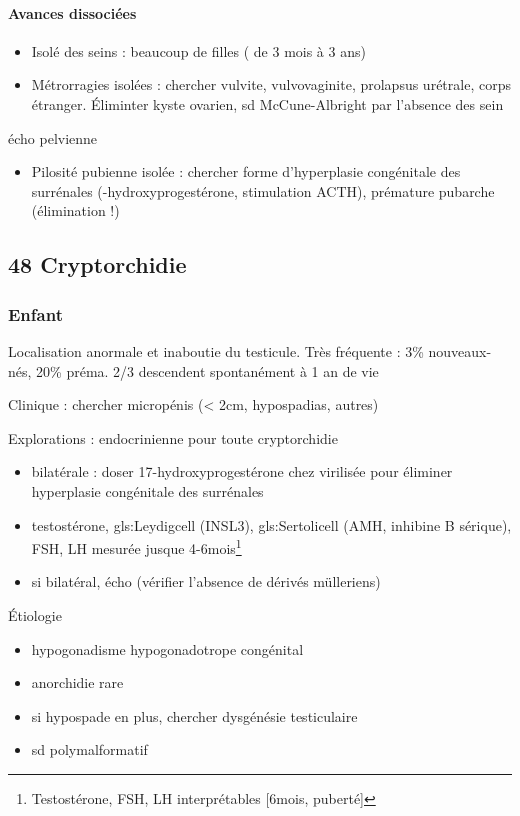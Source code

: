 \documentclass[11pt]{article}
\begin{document}
\paragraph{Avances dissociées}
\label{sec:org7b3ba32}
\begin{itemize}
\item Isolé des seins : beaucoup de filles ( de 3 mois à 3 ans)
\item Métrorragies isolées : chercher vulvite, vulvovaginite, prolapsus urétrale,
corps étranger. Éliminter kyste ovarien, sd McCune-Albright par l'absence des
sein
\end{itemize}
\thus écho pelvienne
\begin{itemize}
\item Pilosité pubienne isolée : chercher forme d'hyperplasie congénitale des
surrénales (-hydroxyprogestérone, stimulation ACTH), prémature pubarche
(élimination !)
\end{itemize}

\subsection{48 \textdagger{} Cryptorchidie}
\label{sec:orge109198}
\subsubsection{Enfant}
\label{sec:org6586e5e}
Localisation anormale et inaboutie du testicule. Très fréquente : 3\%
nouveaux-nés, 20\% préma. 2/3 descendent spontanément à 1 an de vie

Clinique : chercher micropénis (< 2cm, hypospadias, autres)

Explorations : endocrinienne pour toute cryptorchidie \danger
\begin{itemize}
\item bilatérale : doser 17-hydroxyprogestérone chez \female{} virilisée pour éliminer hyperplasie
congénitale des surrénales
\item testostérone, gls:Leydigcell (INSL3), gls:Sertolicell (AMH, inhibine B sérique), FSH, LH mesurée jusque 4-6mois\footnote{\danger Testostérone, FSH, LH interprétables [6mois, puberté]}
\item si bilatéral, écho (vérifier l'absence de dérivés mülleriens)
\end{itemize}

Étiologie
\begin{itemize}
\item hypogonadisme hypogonadotrope congénital
\item anorchidie rare
\item si hypospade en plus, chercher dysgénésie testiculaire
\item sd polymalformatif
\end{itemize}
\end{document}
